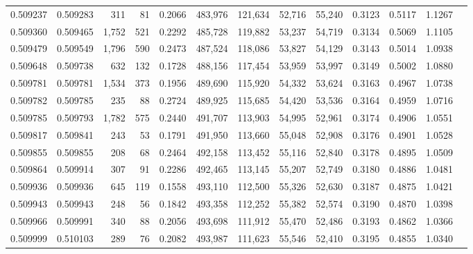 \begin{tabular}{rrrrrrrrrrrrr}
0.509237 & 0.509283 &   311 &    81 &                                     0.2066 & 483,976 & 121,634 &  52,716 &  55,240 & 0.3123 & 0.5117 & 1.1267 \\
0.509360 & 0.509465 & 1,752 &   521 &                                     0.2292 & 485,728 & 119,882 &  53,237 &  54,719 & 0.3134 & 0.5069 & 1.1105 \\
0.509479 & 0.509549 & 1,796 &   590 &                                     0.2473 & 487,524 & 118,086 &  53,827 &  54,129 & 0.3143 & 0.5014 & 1.0938 \\
0.509648 & 0.509738 &   632 &   132 &                                     0.1728 & 488,156 & 117,454 &  53,959 &  53,997 & 0.3149 & 0.5002 & 1.0880 \\
0.509781 & 0.509781 & 1,534 &   373 &                                     0.1956 & 489,690 & 115,920 &  54,332 &  53,624 & 0.3163 & 0.4967 & 1.0738 \\
0.509782 & 0.509785 &   235 &    88 &                                     0.2724 & 489,925 & 115,685 &  54,420 &  53,536 & 0.3164 & 0.4959 & 1.0716 \\
0.509785 & 0.509793 & 1,782 &   575 &                                     0.2440 & 491,707 & 113,903 &  54,995 &  52,961 & 0.3174 & 0.4906 & 1.0551 \\
0.509817 & 0.509841 &   243 &    53 &                                     0.1791 & 491,950 & 113,660 &  55,048 &  52,908 & 0.3176 & 0.4901 & 1.0528 \\
0.509855 & 0.509855 &   208 &    68 &                                     0.2464 & 492,158 & 113,452 &  55,116 &  52,840 & 0.3178 & 0.4895 & 1.0509 \\
0.509864 & 0.509914 &   307 &    91 &                                     0.2286 & 492,465 & 113,145 &  55,207 &  52,749 & 0.3180 & 0.4886 & 1.0481 \\
0.509936 & 0.509936 &   645 &   119 &                                     0.1558 & 493,110 & 112,500 &  55,326 &  52,630 & 0.3187 & 0.4875 & 1.0421 \\
0.509943 & 0.509943 &   248 &    56 &                                     0.1842 & 493,358 & 112,252 &  55,382 &  52,574 & 0.3190 & 0.4870 & 1.0398 \\
0.509966 & 0.509991 &   340 &    88 &                                     0.2056 & 493,698 & 111,912 &  55,470 &  52,486 & 0.3193 & 0.4862 & 1.0366 \\
0.509999 & 0.510103 &   289 &    76 &                                     0.2082 & 493,987 & 111,623 &  55,546 &  52,410 & 0.3195 & 0.4855 & 1.0340 \\

\end{tabular}
